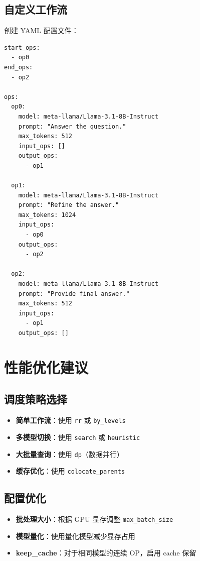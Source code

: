 \documentclass[12pt,a4paper]{article}
\begin{document}
\subsection{自定义工作流}

创建 YAML 配置文件：

\begin{lstlisting}
start_ops:
  - op0
end_ops:
  - op2

ops:
  op0:
    model: meta-llama/Llama-3.1-8B-Instruct
    prompt: "Answer the question."
    max_tokens: 512
    input_ops: []
    output_ops:
      - op1
  
  op1:
    model: meta-llama/Llama-3.1-8B-Instruct
    prompt: "Refine the answer."
    max_tokens: 1024
    input_ops:
      - op0
    output_ops:
      - op2
  
  op2:
    model: meta-llama/Llama-3.1-8B-Instruct
    prompt: "Provide final answer."
    max_tokens: 512
    input_ops:
      - op1
    output_ops: []
\end{lstlisting}

\section{性能优化建议}

\subsection{调度策略选择}

\begin{itemize}
    \item \textbf{简单工作流}：使用 \texttt{rr} 或 \texttt{by\_levels}
    \item \textbf{多模型切换}：使用 \texttt{search} 或 \texttt{heuristic}
    \item \textbf{大批量查询}：使用 \texttt{dp}（数据并行）
    \item \textbf{缓存优化}：使用 \texttt{colocate\_parents}
\end{itemize}

\subsection{配置优化}

\begin{itemize}
    \item \textbf{批处理大小}：根据 GPU 显存调整 \texttt{max\_batch\_size}
    \item \textbf{模型量化}：使用量化模型减少显存占用
    \item \textbf{keep\_cache}：对于相同模型的连续 OP，启用 cache 保留
\end{itemize}
\end{document}
